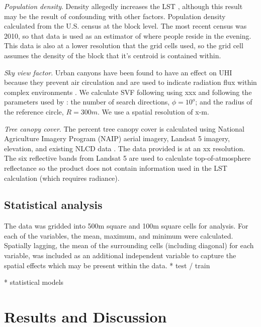 \documentclass[]{elsarticle}
\begin{document}
\textit{Population density}. Density allegedly increases the LST \cite{Li2017-yl}, although this result may be the result of confounding with other factors. Population density calculated from the U.S. census at the block level. The most recent census was 2010, so that data is used as an estimator of where people reside in the evening. This data is also at a lower resolution that the grid cells used, so the grid cell assumes the density of the block that it's centroid is contained within.

\textit{Sky view factor}. Urban canyons have been found to have an effect on UHI because they prevent air circulation \cite{Landsberg1981, Chun2017-mm} and are used to indicate radiation flux within complex environments \cite{Matzarakis2007-xy}. We calculate SVF following using xxx and following the parameters used by \cite{Chun2017-mm}: the number of search directions, $\phi=10^o$; and the radius of the reference circle, $R=300m$. We use a spatial resolution of x-m.

\textit{Tree canopy cover}. The percent tree canopy cover is calculated using National Agriculture Imagery Program (NAIP) aerial imagery, Landsat 5 imagery, elevation, and existing NLCD data \cite{Coulston2012-uu, Homer2015-ce}. The data provided is at an xx resolution. The six reflective bands from Landsat 5 are used to calculate top-of-atmosphere reflectance \cite{Coulston2012-uu} so the product does not contain information used in the LST calculation (which requires radiance). 

\subsection{Statistical analysis}
The data was gridded into 500m square and 100m square cells for analysis. For each of the variables, the mean, maximum, and minimum were calculated. Spatially lagging, the mean of the surrounding cells (including diagonal) for each variable, was included as an additional independent variable to capture the spatial effects which may be present within the data. 
* test / train

* statistical models

\section{Results and Discussion}
\end{document}
